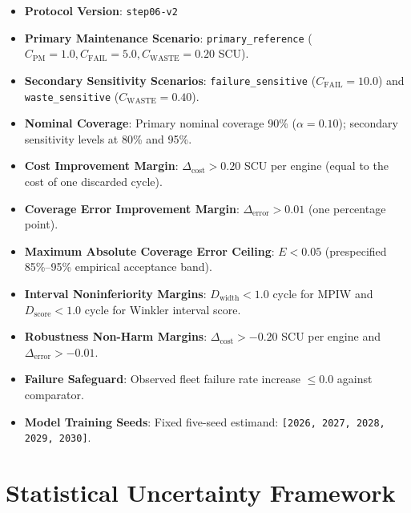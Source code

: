 \documentclass{article}
\begin{document}
\begin{itemize}[leftmargin=*]
  \item \textbf{Protocol Version}: \texttt{step06-v2}
  \item \textbf{Primary Maintenance Scenario}: \texttt{primary\_reference} ($C_{\text{PM}} = 1.0, C_{\text{FAIL}} = 5.0, C_{\text{WASTE}} = 0.20$ SCU).
  \item \textbf{Secondary Sensitivity Scenarios}: \texttt{failure\_sensitive} ($C_{\text{FAIL}} = 10.0$) and \texttt{waste\_sensitive} ($C_{\text{WASTE}} = 0.40$).
  \item \textbf{Nominal Coverage}: Primary nominal coverage 90\% ($\alpha = 0.10$); secondary sensitivity levels at 80\% and 95\%.
  \item \textbf{Cost Improvement Margin}: $\Delta_{\text{cost}} > 0.20$ SCU per engine (equal to the cost of one discarded cycle).
  \item \textbf{Coverage Error Improvement Margin}: $\Delta_{\text{error}} > 0.01$ (one percentage point).
  \item \textbf{Maximum Absolute Coverage Error Ceiling}: $E < 0.05$ (prespecified 85\%--95\% empirical acceptance band).
  \item \textbf{Interval Noninferiority Margins}: $D_{\text{width}} < 1.0$ cycle for MPIW and $D_{\text{score}} < 1.0$ cycle for Winkler interval score.
  \item \textbf{Robustness Non-Harm Margins}: $\Delta_{\text{cost}} > -0.20$ SCU per engine and $\Delta_{\text{error}} > -0.01$.
  \item \textbf{Failure Safeguard}: Observed fleet failure rate increase $\le 0.0$ against comparator.
  \item \textbf{Model Training Seeds}: Fixed five-seed estimand: \texttt{[2026, 2027, 2028, 2029, 2030]}.
\end{itemize}

\section*{Statistical Uncertainty Framework}
\end{document}
